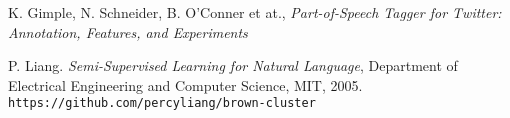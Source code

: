 \documentclass[conference]{IEEEtran}
\begin{document}


%
%
%
\begin{thebibliography}{1}



K. Gimple, N. Schneider, B. O'Conner et at., \emph{Part-of-Speech Tagger for Twitter: Annotation, Features, and Experiments}

P. Liang. \emph{Semi-Supervised Learning for Natural Language}, Department of Electrical Engineering and Computer Science, MIT, 2005.
\verb|https://github.com/percyliang/brown-cluster|




\end{thebibliography}
\end{document}
